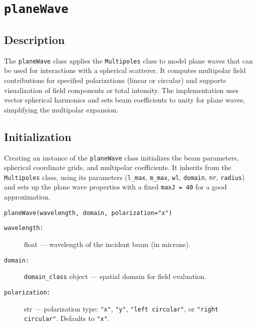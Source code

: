 \section{\texttt{planeWave}}

\subsection{Description}
The \texttt{planeWave} class applies the \texttt{Multipoles} class to model plane waves that can be used for interactions with a spherical scatterer. It computes multipolar field contributions for specified polarizations (linear or circular) and supports visualization of field components or total intensity. The implementation uses vector spherical harmonics and sets beam coefficients to unity for plane waves, simplifying the multipolar expansion.

\subsection{Initialization}
Creating an instance of the \texttt{planeWave} class initializes the beam parameters, spherical coordinate grids, and multipolar coefficients. It inherits from the \texttt{Multipoles} class, using its parameters (\texttt{l\_max}, \texttt{m\_max}, \texttt{wl}, \texttt{domain}, \texttt{nr}, \texttt{radius}) and sets up the plane wave properties with a fixed \texttt{maxJ = 40} for a good approximation.

\begin{verbatim}
planeWave(wavelength, domain, polarization="x")
\end{verbatim}

\begin{description}
    \item[\texttt{wavelength:}] float — wavelength of the incident beam (in microns).
    \item[\texttt{domain:}] \texttt{domain\_class} object — spatial domain for field evaluation.
    \item[\texttt{polarization:}] str — polarization type: \texttt{"x"}, \texttt{"y"}, \texttt{"left circular"}, or \texttt{"right circular"}. Defaults to \texttt{"x"}.
\end{description}

